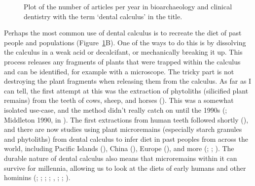\documentclass[
  b5paper,
]{book}
\begin{document}
\begin{figure}


\caption{\label{fig-plot-and-wordclouds}Plot of the number of articles
per year in bioarchaeology and clinical dentistry with the term `dental
calculus' in the title.}

\end{figure}%

Perhaps the most common use of dental calculus is to recreate the diet
of past people and populations (Figure~\ref{fig-plot-and-wordclouds}B).
One of the ways to do this is by dissolving the calculus in a weak acid
or decalcifant, or mechanically breaking it up. This process releases
any fragments of plants that were trapped within the calculus and can be
identified, for example with a microscope. The tricky part is not
destroying the plant fragments when releasing them from the calculus. As
far as I can tell, the first attempt at this was the extraction of
phytoliths (silicified plant remains) from the teeth of cows, sheep, and
horses (). This was a somewhat isolated use-case, and the method didn't
really catch on until the 1990s
(;
Middleton 1990, in ). The first extractions from human teeth followed
shortly (), and
there are now studies using plant microremains (especially starch
granules and phytoliths) from dental calculus to infer diet in past
peoples from across the world, including Pacific Islands
(), China
(), Europe
(), and
more (;
;
). The durable nature of dental calculus also means that
microremains within it can survive for millennia, allowing us to look at
the diets of early humans and other hominins
(;
;
;
;
,
;
;
).
\end{document}
